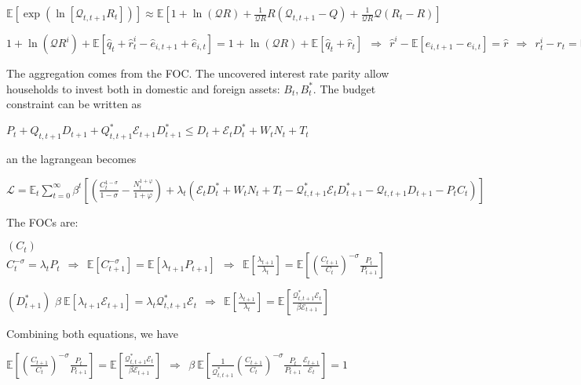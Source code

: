 \documentclass[
]{article}
\begin{document}
\(\displaystyle \mathbb{E} \left[\exp \left( \ln \left[ \mathcal{Q}_{t,t+1} R_t \right] \right) \right] \approx \mathbb{E} \left[ 1 + \ln(\mathcal{Q}R) +\frac{1}{\mathcal{Q}R}R (\mathcal{Q}_{t,t+1}-Q) +\frac{1}{\mathcal{Q}R} \mathcal{Q} (R_t-R)\right]\)

\(\displaystyle 1+ \ln(\mathcal{Q}R^i) + \mathbb{E} \left[ \hat{q}_t+\hat{r}_t^i - \hat{e}_{i,t+1} + \hat{e}_{i,t}\right] = 1 + \ln(\mathcal{Q}R) + \mathbb{E} \left[ \hat{q}_t + \hat{r}_t \right] \ \ \Rightarrow \ \ \hat{r}^i - \mathbb{E} \left[ e_{i,t+1}-e_{i,t}\right] = \hat{r} \ \ \Rightarrow \ \ r_t^i-r_t=\mathbb{E}_t[\Delta e_{i,t+1}]\)

The aggregation comes from the FOC. The uncovered interest rate parity
allow households to invest both in domestic and foreign assets:
\(B_t, B_t^*\). The budget constraint can be written as

\(P_t + Q_{t,t+1}D_{t+1}+Q_{t,t+1}^*\mathcal{E}_{t+1}D_{t+1}^* \leq D_t+\mathcal{E}_{t}D_t^*+W_tN_t+T_t\)

an the lagrangean becomes

\(\mathcal{L} = \displaystyle \mathbb{E}_t \sum_{t=0}^\infty \beta^t \left[ \left( \frac{C_t^{1-\sigma}}{1-\sigma}-\frac{N_t^{1+\varphi}}{1+\varphi} \right) + \lambda_t \left(\mathcal{E}_t D_t^* + W_tN_t + T_t - \mathcal{Q}_{t,t+1}^*\mathcal{E}_t D_{t+1}^* - \mathcal{Q}_{t,t+1}D_{t+1} - P_t C_t \right) \right]\)

The FOCs are:

\((C_t)\)
\(\displaystyle C_t^{-\sigma} = \lambda_tP_t \ \ \Rightarrow \ \ \mathbb{E}[C_{t+1}^{-\sigma}] = \mathbb{E}[\lambda_{t+1}P_{t+1}] \ \ \Rightarrow \ \ \displaystyle \mathbb{E}\left[ \frac{\lambda_{t+1}}{\lambda_t}\right] = \mathbb{E}\left[ \left( \frac{C_{t+1}}{C_t} \right)^{-\sigma}\frac{P_t}{P_{t+1}}\right]\)

\((D_{t+1}^*)\)
\(\beta \ \mathbb{E}[\lambda_{t+1} \mathcal{E}_{t+1}] = \lambda_t\mathcal{Q}_{t,t+1}^* \mathcal{E}_t \ \ \Rightarrow \ \ \displaystyle \mathbb{E}\left[ \frac{\lambda_{t+1}}{\lambda_t}\right] = \mathbb{E}\left[ \frac{\mathcal{Q}_{t,t+1}^*\mathcal{E}_t}{\beta \mathcal{E}_{t+1}}\right]\)

Combining both equations, we have

\(\displaystyle \mathbb{E}\left[ \left( \frac{C_{t+1}}{C_t} \right)^{-\sigma}\frac{P_t}{P_{t+1}}\right] = \mathbb{E}\left[ \frac{\mathcal{Q}_{t,t+1}^*\mathcal{E}_t}{\beta \mathcal{E}_{t+1}}\right] \ \ \Rightarrow \ \ \beta \  \displaystyle \mathbb{E}\left[ \frac{1}{\mathcal{Q}_{t,t+1}^*} \left( \frac{C_{t+1}}{C_t} \right)^{-\sigma}\frac{P_t}{P_{t+1}} \frac{\mathcal{E}_{t+1}}{\mathcal{E}_{t}} \right]=1\)
\end{document}
